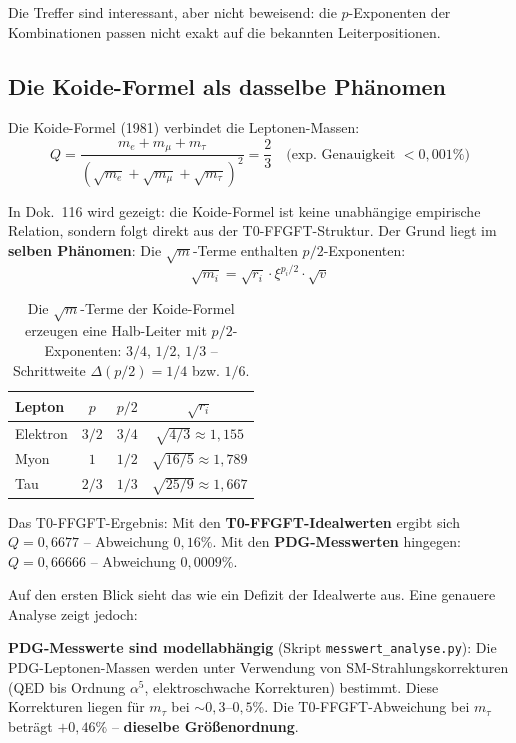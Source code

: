 Die Treffer sind interessant, aber nicht beweisend: die
$p$-Exponenten der Kombinationen passen nicht exakt auf die
bekannten Leiterpositionen.

\subsection{Die Koide-Formel als dasselbe Phänomen}

Die Koide-Formel (1981) verbindet die Leptonen-Massen:
\begin{equation}
    Q = \frac{m_e + m_\mu + m_\tau}
    {(\sqrt{m_e} + \sqrt{m_\mu} + \sqrt{m_\tau})^2} = \frac{2}{3}
    \quad \text{(exp. Genauigkeit $< 0{,}001\%$)}
\end{equation}

In Dok.~116 wird gezeigt: die Koide-Formel ist keine unabhängige
empirische Relation, sondern folgt direkt aus der T0-FFGFT-Struktur.
Der Grund liegt im \textbf{selben Phänomen}: Die $\sqrt{m}$-Terme
enthalten $p/2$-Exponenten:
\begin{equation}
    \sqrt{m_i} = \sqrt{r_i} \cdot \xi^{p_i/2} \cdot \sqrt{v}
\end{equation}

\begin{table}[htbp]
\centering\small
\begin{tabular}{lccc}
\toprule
\textbf{Lepton} & $p$ & $p/2$ & $\sqrt{r_i}$ \\
\midrule
Elektron & $3/2$ & $3/4$ & $\sqrt{4/3} \approx 1{,}155$ \\
Myon     & $1$   & $1/2$ & $\sqrt{16/5} \approx 1{,}789$ \\
Tau      & $2/3$ & $1/3$ & $\sqrt{25/9} \approx 1{,}667$ \\
\bottomrule
\end{tabular}
\caption{Die $\sqrt{m}$-Terme der Koide-Formel erzeugen eine
Halb-Leiter mit $p/2$-Exponenten: $3/4$, $1/2$, $1/3$ --
Schrittweite $\Delta(p/2) = 1/4$ bzw. $1/6$.}
\label{tab:koide_p}
\end{table}

Das T0-FFGFT-Ergebnis: Mit den \textbf{T0-FFGFT-Idealwerten} ergibt sich $Q = 0{,}6677$ -- Abweichung $0{,}16\%$. Mit den \textbf{PDG-Messwerten} hingegen: $Q = 0{,}66666$ -- Abweichung $0{,}0009\%$.

Auf den ersten Blick sieht das wie ein Defizit der Idealwerte aus.
Eine genauere Analyse zeigt jedoch:

\textbf{PDG-Messwerte sind modellabhängig} (Skript \texttt{messwert\_analyse.py}):
Die PDG-Leptonen-Massen werden unter Verwendung von SM-Strahlungs\-korrekturen
(QED bis Ordnung $\alpha^5$, elektroschwache Korrekturen) bestimmt.
Diese Korrekturen liegen für $m_\tau$ bei $\sim 0{,}3$--$0{,}5\%$.
Die T0-FFGFT-Abweichung bei $m_\tau$ beträgt $+0{,}46\%$ --
\textbf{dieselbe Größenordnung}.


